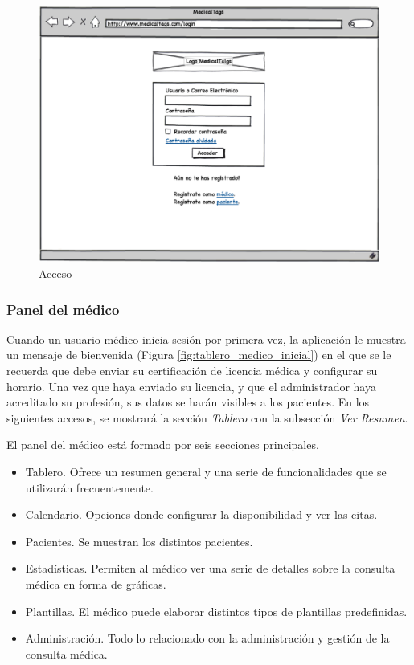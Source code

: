 \documentclass[a4paper,oneside,11pt]{book}
\begin{document}
			\begin{figure}[H]
			  \centering
			    \includegraphics[width=12cm]{img/eps/5_Acceso.eps}
			  \caption{Acceso}
			  \label{fig:acceso}
			\end{figure}
			
	
	\subsubsection{Panel del médico} %
		\label{sub:panel_medico}
		
		Cuando un usuario médico inicia sesión por primera vez, la aplicación le muestra un mensaje de bienvenida (Figura \ref{fig:tablero_medico_inicial}) en el que se le recuerda que debe enviar su certificación de licencia médica y configurar su horario. Una vez que haya enviado su licencia, y que el administrador haya acreditado su profesión, sus datos se harán visibles a los pacientes. En los siguientes accesos, se mostrará la sección \textit{Tablero} con la subsección \textit{Ver Resumen}.		
	
		El panel del médico está formado por seis secciones principales.
		\begin{itemize}
			\item Tablero. Ofrece un resumen general y una serie de funcionalidades que se utilizarán frecuentemente.
			\item Calendario. Opciones donde configurar la disponibilidad y ver las citas.
			\item Pacientes. Se muestran los distintos pacientes.
			\item Estadísticas. Permiten al médico ver una serie de detalles sobre la consulta médica en forma de gráficas.
			\item Plantillas. El médico puede elaborar distintos tipos de plantillas predefinidas.
			\item Administración. Todo lo relacionado con la administración y gestión de la consulta médica.
		\end{itemize}
		
\end{document}
